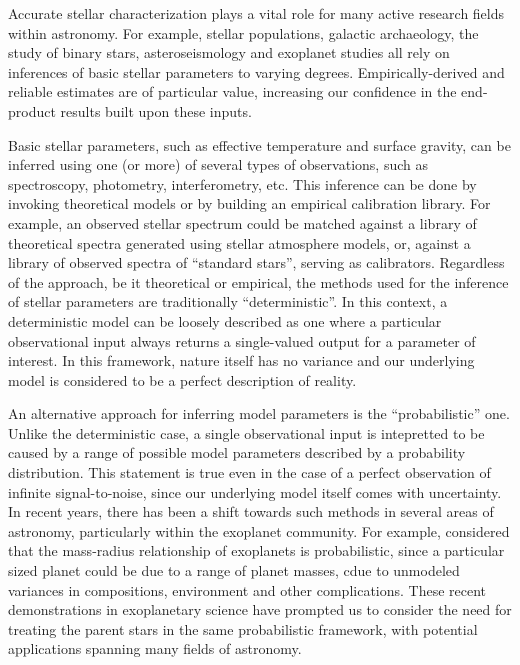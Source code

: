 
Accurate stellar characterization plays a vital role for many active research 
fields within astronomy. For example, stellar populations, galactic archaeology, 
the study of binary stars, asteroseismology and exoplanet studies all rely on 
inferences of basic stellar parameters to varying degrees. Empirically-derived
and reliable estimates are of particular value, increasing our confidence in the
end-product results built upon these inputs. 

Basic stellar parameters, such as effective temperature and surface gravity, 
can be inferred using one (or more) of several types of observations, such as
spectroscopy, photometry, interferometry, etc. This inference can be done by
invoking theoretical models or by building an empirical calibration library.
For example, an observed stellar spectrum could be matched against a library of 
theoretical spectra generated using stellar atmosphere models, or, against a 
library of observed spectra of ``standard stars'', serving as calibrators.
Regardless of the approach, be it theoretical or empirical, the methods used
for the inference of stellar parameters are traditionally ``deterministic''.
In this context, a deterministic model can be loosely described as one where
a particular observational input always returns a single-valued output for a 
parameter of interest. In this framework, nature itself has no variance and
our underlying model is considered to be a perfect description of reality.

An alternative approach for inferring model parameters is the 
``probabilistic'' one. Unlike the deterministic case, a single observational 
input is intepretted to be caused by a range of possible model parameters
described by a probability distribution. This statement is true even in the case
of a perfect observation of infinite signal-to-noise, since our underlying 
model itself comes with uncertainty. In recent years, there has been a shift 
towards such methods in several areas of astronomy, particularly within the 
exoplanet community. For example, \citet{wolfgang:2015} considered that
the mass-radius relationship of exoplanets is probabilistic, since a particular
sized planet could be due to a range of planet masses, cdue to unmodeled 
variances in compositions, environment and other complications. These recent 
demonstrations in exoplanetary science have prompted us to consider the need for 
treating the parent stars in the same probabilistic framework, with potential 
applications spanning many fields of astronomy.

